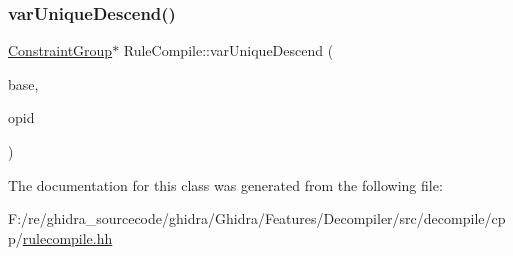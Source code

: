 \mbox{\label{class_rule_compile_a76c72454129a3e8e7113fa8621859789}} 
\subsubsection{\texorpdfstring{varUniqueDescend()}{varUniqueDescend()}}
{\footnotesize\ttfamily \mbox{\hyperlink{class_constraint_group}{Constraint\+Group}}$\ast$ Rule\+Compile\+::var\+Unique\+Descend (\begin{DoxyParamCaption}\item[{\mbox{\hyperlink{class_constraint_group}{Constraint\+Group}} $\ast$}]{base,  }\item[{int4}]{opid }\end{DoxyParamCaption})}



The documentation for this class was generated from the following file\+:\begin{DoxyCompactItemize}
\item 
F\+:/re/ghidra\+\_\+sourcecode/ghidra/\+Ghidra/\+Features/\+Decompiler/src/decompile/cpp/\mbox{\hyperlink{rulecompile_8hh}{rulecompile.\+hh}}\end{DoxyCompactItemize}
